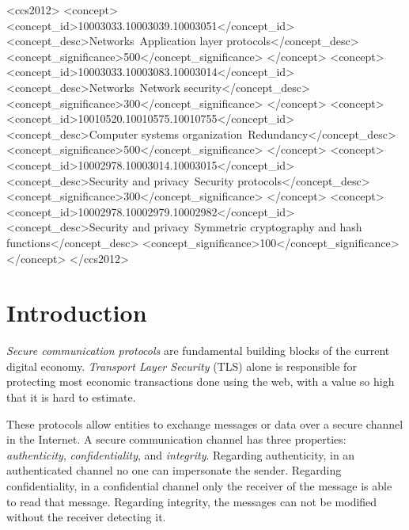 \documentclass{sig-alternate-05-2015}
\begin{document}
%
%
\begin{CCSXML}
<ccs2012>
<concept>
<concept_id>10003033.10003039.10003051</concept_id>
<concept_desc>Networks~Application layer protocols</concept_desc>
<concept_significance>500</concept_significance>
</concept>
<concept>
<concept_id>10003033.10003083.10003014</concept_id>
<concept_desc>Networks~Network security</concept_desc>
<concept_significance>300</concept_significance>
</concept>
<concept>
<concept_id>10010520.10010575.10010755</concept_id>
<concept_desc>Computer systems organization~Redundancy</concept_desc>
<concept_significance>500</concept_significance>
</concept>
<concept>
<concept_id>10002978.10003014.10003015</concept_id>
<concept_desc>Security and privacy~Security protocols</concept_desc>
<concept_significance>300</concept_significance>
</concept>
<concept>
<concept_id>10002978.10002979.10002982</concept_id>
<concept_desc>Security and privacy~Symmetric cryptography and hash functions</concept_desc>
<concept_significance>100</concept_significance>
</concept>
</ccs2012>
\end{CCSXML}


%
%

%
%
\printccsdesc


\section{Introduction}
\label{sec-introduction}

\textit{Secure communication protocols} are fundamental building blocks of the current digital economy. \textit{Transport Layer Security} (TLS) alone is responsible for protecting most economic transactions done using the web, with a value so high that it is hard to estimate.

These protocols allow entities to exchange messages or data over a secure channel in the Internet.
A secure communication channel has three properties: \textit{authenticity}, \textit{confidentiality}, and \textit{integrity}. 
Regarding authenticity, in an authenticated channel no one can impersonate the sender.
Regarding confidentiality, in a confidential channel only  the receiver of the message is able to read that message. 
Regarding integrity, the messages can not be modified without the receiver detecting it. 
\end{document}
